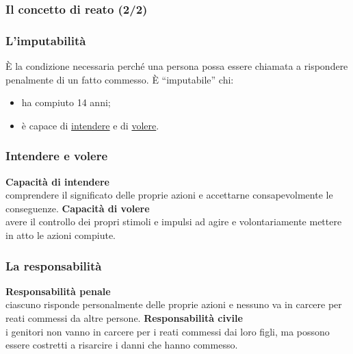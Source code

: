 \documentclass[13pt]{beamer}
\begin{document}
	\begin{frame}
		\frametitle{Il concetto di reato (2/2)}
		
	\end{frame}
	
	\begin{frame}
		\frametitle{L'imputabilità}
		È la condizione necessaria perché una persona possa essere chiamata a rispondere penalmente di un fatto commesso.
		\vfill
		È ``imputabile'' chi:
		\begin{itemize}
			\item ha compiuto 14 anni;
			\item è capace di \underline{intendere} e di \underline{volere}.
		\end{itemize}
		
	\end{frame}

	\begin{frame}
		\frametitle{Intendere e volere}
		\textbf{Capacità di intendere}\\
		comprendere il significato delle proprie azioni e accettarne consapevolmente le conseguenze.
		\vfill
		\textbf{Capacità di volere} \\
		avere il controllo dei propri stimoli e impulsi ad agire e volontariamente mettere in atto le azioni compiute.
	\end{frame}	

	\begin{frame}
		\frametitle{La responsabilità}
			\textbf{Responsabilità penale}\\ ciascuno risponde personalmente delle proprie azioni e nessuno va in carcere per reati commessi da altre persone.
			\vfill
			\textbf{Responsabilità civile}\\ i genitori non vanno in carcere per i reati commessi dai loro figli, ma possono essere costretti a risarcire i danni che hanno commesso.
	\end{frame}	
	
\end{document}
